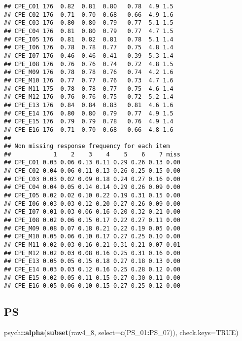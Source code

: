 \documentclass[
]{article}
\newenvironment{Shaded}{\begin{snugshade}}{\end{snugshade}}
\newcommand{\AttributeTok}[1]{\textcolor[rgb]{0.13,0.29,0.53}{#1}}
\newcommand{\ConstantTok}[1]{\textcolor[rgb]{0.56,0.35,0.01}{#1}}
\newcommand{\FunctionTok}[1]{\textcolor[rgb]{0.13,0.29,0.53}{\textbf{#1}}}
\newcommand{\NormalTok}[1]{#1}
\newcommand{\SpecialCharTok}[1]{\textcolor[rgb]{0.81,0.36,0.00}{\textbf{#1}}}
\begin{document}
\begin{verbatim}
## CPE_C01 176  0.82  0.81  0.80   0.78  4.9 1.5
## CPE_C02 176  0.71  0.70  0.68   0.66  4.9 1.6
## CPE_C03 176  0.80  0.80  0.79   0.77  5.1 1.5
## CPE_C04 176  0.81  0.80  0.79   0.77  4.7 1.5
## CPE_I05 176  0.81  0.82  0.81   0.78  5.1 1.4
## CPE_I06 176  0.78  0.78  0.77   0.75  4.8 1.4
## CPE_I07 176  0.46  0.46  0.41   0.39  5.3 1.4
## CPE_I08 176  0.76  0.76  0.74   0.72  4.8 1.5
## CPE_M09 176  0.78  0.78  0.76   0.74  4.2 1.6
## CPE_M10 176  0.77  0.77  0.76   0.73  4.7 1.6
## CPE_M11 175  0.78  0.78  0.77   0.75  4.6 1.4
## CPE_M12 176  0.76  0.76  0.75   0.72  5.2 1.4
## CPE_E13 176  0.84  0.84  0.83   0.81  4.6 1.6
## CPE_E14 176  0.80  0.80  0.79   0.77  4.9 1.5
## CPE_E15 176  0.79  0.79  0.78   0.76  4.9 1.4
## CPE_E16 176  0.71  0.70  0.68   0.66  4.8 1.6
## 
## Non missing response frequency for each item
##            1    2    3    4    5    6    7 miss
## CPE_C01 0.03 0.06 0.13 0.11 0.29 0.26 0.13 0.00
## CPE_C02 0.04 0.06 0.11 0.13 0.26 0.25 0.15 0.00
## CPE_C03 0.03 0.02 0.09 0.18 0.24 0.27 0.16 0.00
## CPE_C04 0.04 0.05 0.14 0.14 0.29 0.26 0.09 0.00
## CPE_I05 0.02 0.02 0.10 0.22 0.19 0.31 0.15 0.00
## CPE_I06 0.03 0.03 0.12 0.20 0.27 0.26 0.09 0.00
## CPE_I07 0.01 0.03 0.06 0.16 0.20 0.32 0.21 0.00
## CPE_I08 0.02 0.06 0.15 0.17 0.22 0.27 0.11 0.00
## CPE_M09 0.08 0.07 0.18 0.21 0.22 0.19 0.05 0.00
## CPE_M10 0.05 0.06 0.10 0.17 0.27 0.25 0.10 0.00
## CPE_M11 0.02 0.03 0.16 0.21 0.31 0.21 0.07 0.01
## CPE_M12 0.02 0.03 0.08 0.16 0.25 0.31 0.16 0.00
## CPE_E13 0.05 0.05 0.15 0.18 0.27 0.18 0.13 0.00
## CPE_E14 0.03 0.03 0.12 0.16 0.25 0.28 0.12 0.00
## CPE_E15 0.02 0.05 0.11 0.15 0.27 0.30 0.11 0.00
## CPE_E16 0.05 0.06 0.10 0.15 0.27 0.25 0.12 0.00
\end{verbatim}

\subsection{PS}\label{ps}

\begin{Shaded}
\begin{Highlighting}[]
\NormalTok{psych}\SpecialCharTok{::}\FunctionTok{alpha}\NormalTok{(}\FunctionTok{subset}\NormalTok{(raw4\_8, }\AttributeTok{select=}\FunctionTok{c}\NormalTok{(PS\_01}\SpecialCharTok{:}\NormalTok{PS\_07)), }\AttributeTok{check.keys=}\ConstantTok{TRUE}\NormalTok{)}
\end{Highlighting}
\end{Shaded}
\end{document}
